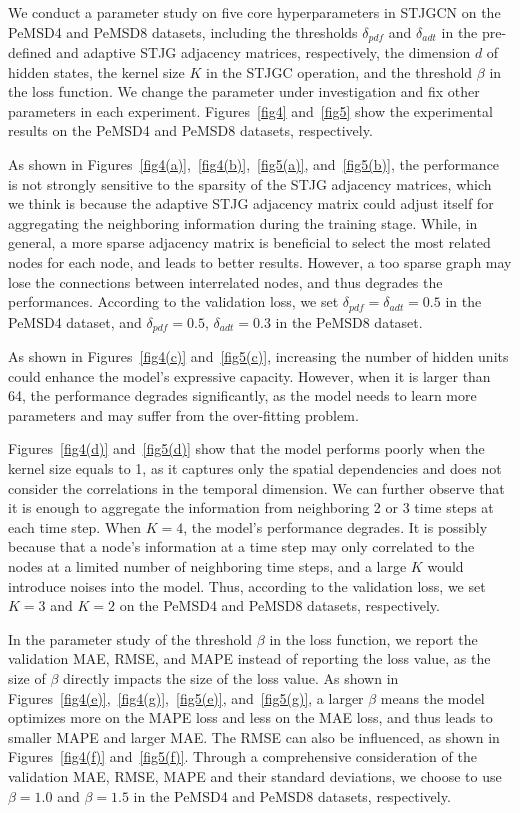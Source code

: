 \documentclass[10pt,journal,compsoc]{IEEEtran}
\begin{document}
We conduct a parameter study on five core hyperparameters in STJGCN on the PeMSD4 and PeMSD8 datasets, including the thresholds $ \delta_{pdf} $ and $ \delta_{adt} $ in the pre-defined and adaptive STJG adjacency matrices, respectively, the dimension $ d $ of hidden states, the kernel size $ K $ in the STJGC operation, and the threshold $ \beta $ in the loss function. We change the parameter under investigation and fix other parameters in each experiment. Figures~\ref{fig4} and~\ref{fig5} show the experimental results on the PeMSD4 and PeMSD8 datasets, respectively.

As shown in Figures~\ref{fig4(a)},~\ref{fig4(b)},~\ref{fig5(a)}, and~\ref{fig5(b)}, the performance is not strongly sensitive to the sparsity of the STJG adjacency matrices, which we think is because the adaptive STJG adjacency matrix could adjust itself for aggregating the neighboring information during the training stage. While, in general, a more sparse adjacency matrix is beneficial to select the most related nodes for each node, and leads to better results. However, a too sparse graph may lose the connections between interrelated nodes, and thus degrades the performances. According to the validation loss, we set $ \delta_{pdf}=\delta_{adt}=0.5 $ in the PeMSD4 dataset, and $ \delta_{pdf}=0.5 $, $ \delta_{adt}=0.3 $ in the PeMSD8 dataset.

As shown in Figures~\ref{fig4(c)} and~\ref{fig5(c)}, increasing the number of hidden units could enhance the model's expressive capacity. However, when it is larger than 64, the performance degrades significantly, as the model needs to learn more parameters and may suffer from the over-fitting problem.

Figures~\ref{fig4(d)} and~\ref{fig5(d)} show that the model performs poorly when the kernel size equals to 1, as it captures only the spatial dependencies and does not consider the correlations in the temporal dimension. We can further observe that it is enough to aggregate the information from neighboring 2 or 3 time steps at each time step. When $ K=4 $, the model's performance degrades. It is possibly because that a node's information at a time step may only correlated to the nodes at a limited number of neighboring time steps, and a large $ K $ would introduce noises into the model. Thus, according to the validation loss, we set $ K=3 $ and $ K=2 $ on the PeMSD4 and PeMSD8 datasets, respectively.

In the parameter study of the threshold $ \beta $ in the loss function, we report the validation MAE, RMSE, and MAPE instead of reporting the loss value, as the size of $ \beta $ directly impacts the size of the loss value. As shown in Figures~\ref{fig4(e)},~\ref{fig4(g)},~\ref{fig5(e)}, and~\ref{fig5(g)}, a larger $ \beta $ means the model optimizes more on the MAPE loss and less on the MAE loss, and thus leads to smaller MAPE and larger MAE. The RMSE can also be influenced, as shown in Figures~\ref{fig4(f)} and~\ref{fig5(f)}. Through a comprehensive consideration of the validation MAE, RMSE, MAPE and their standard deviations, we choose to use $ \beta=1.0 $ and $ \beta=1.5 $ in the PeMSD4 and PeMSD8 datasets, respectively.
\end{document}
